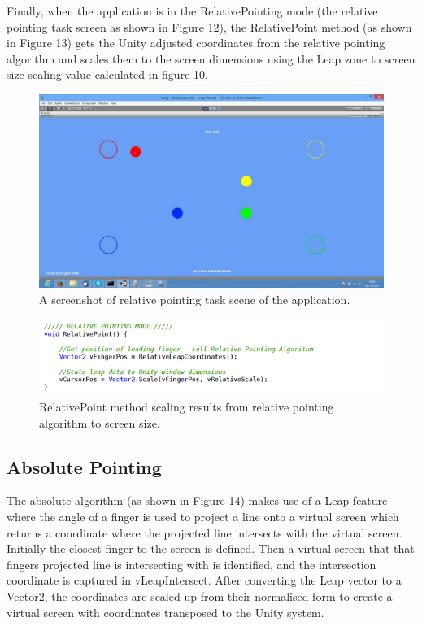 \documentclass[titlepage]{article}
\begin{document}
Finally, when the application is in the RelativePointing mode (the relative pointing task screen as shown in Figure 12), the RelativePoint method (as shown in Figure 13) gets the Unity adjusted coordinates from the  relative pointing algorithm and scales them to the screen dimensions using the Leap zone to screen size scaling value calculated in figure 10.

\begin{figure}[!h]
    \centering
    \includegraphics[width=7.0in]{Figure_13}
    \caption{A screenshot of relative pointing task scene of the application.}
\end{figure}


\begin{figure}[!h]
    \centering
    \includegraphics[width=7.0in]{Figure_12}
    \caption{RelativePoint method scaling results from relative pointing algorithm to screen size.}
\end{figure}


\subsection{Absolute Pointing}
The absolute algorithm (as shown in Figure 14) makes use of a Leap feature where the angle of a finger is used to project a line onto a virtual screen which returns a coordinate where the projected line intersects with the virtual screen. Initially the closest finger to the screen is defined. Then a virtual screen that that fingers projected line is intersecting with is identified, and the intersection coordinate is captured in vLeapIntersect. After converting the Leap vector to a Vector2, the coordinates are scaled up from their normalised form to create a virtual screen with coordinates transposed to the Unity system.
 
\end{document}
